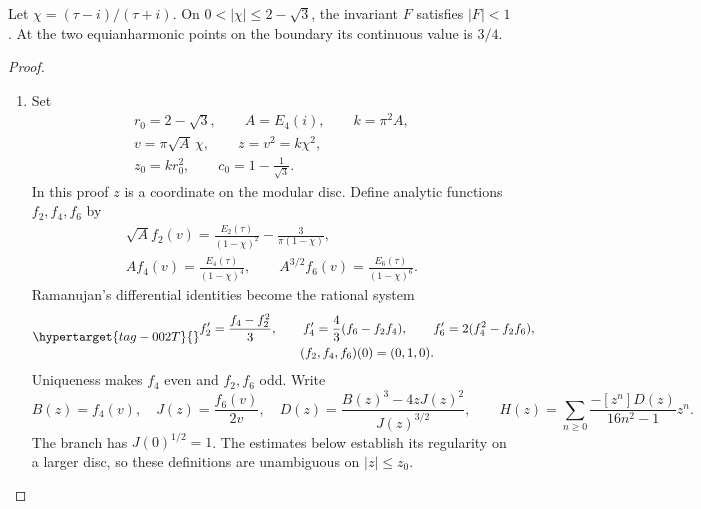 \begin{proposition}\hypertarget{tag-001O}{}\label{ari:C.8.14}

Let $\chi=(\tau-i)/(\tau+i)$. On
$0<|\chi|\le2-\sqrt3$, the invariant $F$ satisfies $|F|<1$.
At the two equianharmonic points on the boundary its continuous
value is $3/4$.
\end{proposition}


\begin{proof}
\begin{enumerate}[label=\arabic*.,leftmargin=*]
\item Set
\[
 \begin{gathered}
 r_0=2-\sqrt3,\qquad A=E_4(i),\qquad k=\pi^2A,\\
 v=\pi\sqrt A\,\chi,\qquad z=v^2=k\chi^2,\\
 z_0=kr_0^2,\qquad c_0=1-\frac1{\sqrt3}.
 \end{gathered}
\]
In this proof $z$ is a coordinate on the modular disc. Define analytic functions $f_2,f_4,f_6$
by
\[
 \begin{gathered}
 \sqrt A f_2(v)=\frac{E_2(\tau)}{(1-\chi)^2}
                         -\frac3{\pi(1-\chi)},\\
 A f_4(v)=\frac{E_4(\tau)}{(1-\chi)^4},\qquad
 A^{3/2} f_6(v)=\frac{E_6(\tau)}{(1-\chi)^6}.
 \end{gathered}
\]
Ramanujan's differential identities become the rational system
\begin{equation}\hypertarget{tag-002T}{}\label{ari:eq:cc-ode}
 \begin{gathered}
 f_2'=\frac{f_4-f_2^2}{3},\qquad
 f_4'=\frac43(f_6-f_2f_4),\qquad
 f_6'=2(f_4^2-f_2f_6),\\
 (f_2,f_4,f_6)(0)=(0,1,0).
 \end{gathered}
\end{equation}
Uniqueness makes $f_4$ even and $f_2,f_6$ odd. Write
\[
 B(z)=f_4(v),\quad J(z)=\frac{f_6(v)}{2v},\quad
 D(z)=\frac{B(z)^3-4zJ(z)^2}{J(z)^{3/2}},\qquad
 H(z)=\sum_{n\ge0}\frac{-[z^n]D(z)}{16n^2-1}z^n.
\]
The branch has $J(0)^{1/2}=1$. The estimates below establish
its regularity on a larger disc, so these definitions are
unambiguous on $|z|\le z_0$.


\end{enumerate}
\end{proof}
